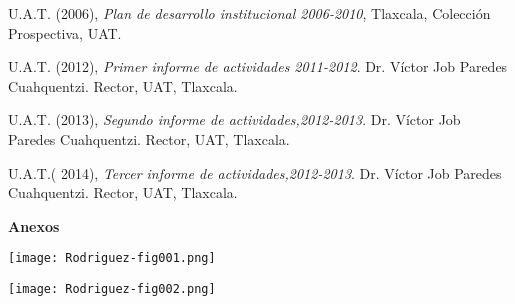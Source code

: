 U.A.T. (2006), \textit{Plan de desarrollo institucional 2006-2010}, Tlaxcala, Colección Prospectiva, UAT.

U.A.T. (2012), \textit{Primer informe de actividades 2011-2012}. Dr. Víctor Job Paredes Cuahquentzi. Rector, UAT, Tlaxcala.

U.A.T. (2013), \textit{Segundo informe de actividades,2012-2013}. Dr. Víctor Job Paredes Cuahquentzi. Rector, UAT, Tlaxcala.

U.A.T.( 2014), \textit{Tercer informe de actividades,2012-2013}. Dr. Víctor Job Paredes Cuahquentzi. Rector, UAT, Tlaxcala.
\newpage

\textbf{Anexos}

\bigskip
\texttt{[image: Rodriguez-fig001.png]}

\bigskip
\texttt{[image: Rodriguez-fig002.png]}

\newpage
\thispagestyle{empty}
\phantom{abc}